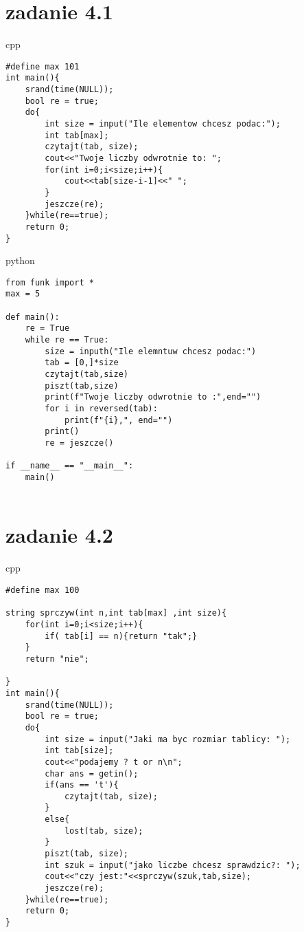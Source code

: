 \documentclass{article}
\begin{document}
\section*{zadanie 4.1}

\begin{temp}{\large cpp}  
\begin{verbatim}
#define max 101
int main(){
    srand(time(NULL));
    bool re = true;
    do{
        int size = input("Ile elementow chcesz podac:");        
        int tab[max];
        czytajt(tab, size);
        cout<<"Twoje liczby odwrotnie to: ";
        for(int i=0;i<size;i++){
            cout<<tab[size-i-1]<<" ";
        }
        jeszcze(re);
    }while(re==true);
    return 0;
}

\end{verbatim}
\end{temp}

\begin{temp}{\large python}  
\begin{verbatim}
from funk import *
max = 5

def main():
    re = True
    while re == True:
        size = inputh("Ile elemntuw chcesz podac:")
        tab = [0,]*size
        czytajt(tab,size)
        piszt(tab,size)
        print(f"Twoje liczby odwrotnie to :",end="")
        for i in reversed(tab):
            print(f"{i},", end="")
        print()
        re = jeszcze()

if __name__ == "__main__":
    main()


\end{verbatim}
\end{temp}

\section*{zadanie 4.2}

\begin{temp}{\large cpp}  
\begin{verbatim}
#define max 100

string sprczyw(int n,int tab[max] ,int size){
    for(int i=0;i<size;i++){
        if( tab[i] == n){return "tak";}
    }
    return "nie";

}
int main(){
    srand(time(NULL));
    bool re = true;
    do{
        int size = input("Jaki ma byc rozmiar tablicy: ");        
        int tab[size];
        cout<<"podajemy ? t or n\n";
        char ans = getin();
        if(ans == 't'){
            czytajt(tab, size);
        }
        else{
            lost(tab, size);
        }
        piszt(tab, size);
        int szuk = input("jako liczbe chcesz sprawdzic?: ");
        cout<<"czy jest:"<<sprczyw(szuk,tab,size);
        jeszcze(re);
    }while(re==true);
    return 0;
}

\end{verbatim}
\end{temp}
\end{document}
